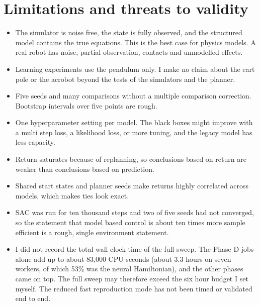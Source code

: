 \documentclass[11pt,a4paper]{article}
\begin{document}
\section{Limitations and threats to validity}
\begin{itemize}[leftmargin=1.5em]
\item The simulator is noise free, the state is fully observed, and the structured model contains the true equations. This is the best case for physics models. A real robot has noise, partial observation, contacts and unmodelled effects.
\item Learning experiments use the pendulum only. I make no claim about the cart pole or the acrobot beyond the tests of the simulators and the planner.
\item Five seeds and many comparisons without a multiple comparison correction. Bootstrap intervals over five points are rough.
\item One hyperparameter setting per model. The black boxes might improve with a multi step loss, a likelihood loss, or more tuning, and the legacy model has less capacity.
\item Return saturates because of replanning, so conclusions based on return are weaker than conclusions based on prediction.
\item Shared start states and planner seeds make returns highly correlated across models, which makes ties look exact.
\item SAC was run for ten thousand steps and two of five seeds had not converged, so the statement that model based control is about ten times more sample efficient is a rough, single environment statement.
\item I did not record the total wall clock time of the full sweep. The Phase D jobs alone add up to about 83{,}000 CPU seconds (about 3.3 hours on seven workers, of which 53\% was the neural Hamiltonian), and the other phases came on top. The full sweep may therefore exceed the six hour budget I set myself. The reduced fast reproduction mode has not been timed or validated end to end.
\end{itemize}

\end{document}
